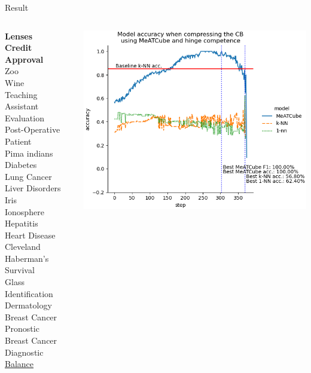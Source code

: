 \documentclass[]{beamer}
\begin{document}
\begin{frame}{Result}
    \begin{columns}
        \begin{column}{.35\textwidth}
            {\smaller\smaller
            \textbf{Lenses} \\
            \textbf{Credit Approval} \\
            Zoo \\
            Wine \\
            Teaching Assistant Evaluation \\
            Post-Operative Patient \\
            Pima indians Diabetes \\
            Lung Cancer \\
            Liver Disorders \\
            Iris \\
            Ionosphere \\
            Hepatitis \\
            Heart Disease Cleveland \\
            Haberman's Survival \\
            Glass Identification \\
            Dermatology \\
            Breast Cancer Pronostic \\
            Breast Cancer Diagnostic \\
            \underline{Balance}\\
            ~}
        \end{column}
        \begin{column}{.65\textwidth}
            \includegraphics[width=.8\textwidth]{../results/figs/balance+scale}

\end{column}
\end{columns}
\end{frame}
\end{document}
